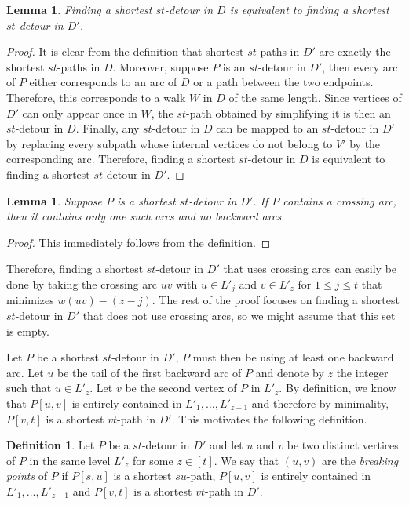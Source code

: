 \documentclass[utf8,11pt]{article}
\theoremstyle{plain}
\newtheorem{lemma}[theorem]{Lemma}
\theoremstyle{definition}
\newtheorem{definition}[theorem]{Definition}
\begin{document}
\begin{lemma}
    Finding a shortest $st$-detour in $D$ is equivalent to finding a shortest $st$-detour in $D'$.
\end{lemma}

\begin{proof}
It is clear from the definition that shortest $st$-paths in $D'$ are exactly the shortest $st$-paths in $D$. Moreover, suppose $P$ is an $st$-detour in $D'$, then every arc of $P$ either corresponds to an arc of $D$ or a path between the two endpoints. Therefore, this corresponds to a walk $W$ in $D$ of the same length. Since vertices of $D'$ can only appear once in $W$, the $st$-path obtained by simplifying it is then an $st$-detour in $D$. Finally, any $st$-detour in $D$ can be mapped to an $st$-detour in $D'$ by replacing every subpath whose internal vertices do not belong to $V'$ by the corresponding arc. Therefore, finding a shortest $st$-detour in $D$ is equivalent to finding a shortest $st$-detour in $D'$. 
\end{proof}


\begin{lemma}
    Suppose $P$ is a shortest $st$-detour in $D'$. If $P$ contains a crossing arc, then it contains only one such arcs and no backward arcs.
\end{lemma}

\begin{proof}
    This immediately follows from the definition.
\end{proof}

Therefore, finding a shortest $st$-detour in $D'$ that uses crossing arcs can easily be done by taking the crossing arc $uv$ with $u \in L'_{j}$ and $v \in L'_{z}$ for $1 \leq j \leq t$ that minimizes $w(uv) - (z-j)$. The rest of the proof focuses on finding a shortest $st$-detour in $D'$ that does not use crossing arcs, so we might assume that this set is empty.

Let $P$ be a shortest $st$-detour in $D'$, $P$ must then be using at least one backward arc. Let $u$ be the tail of the first backward arc of $P$ and denote by $z$ the integer such that $u \in L'_z$. Let $v$ be the second vertex of $P$ in $L'_z$. By definition, we know that $P[u,v]$ is entirely contained in $L'_1, \dots, L'_{z-1}$ and therefore by minimality, $P[v,t]$ is a shortest $vt$-path in $D'$. This motivates the following definition.

\begin{definition}
    Let $P$ be a $st$-detour in $D'$ and let $u$ and $v$ be two distinct vertices of $P$ in the same level $L'_z$ for some $z \in [t]$. We say that $(u,v)$ are the \textit{breaking points} of $P$ if $P[s,u]$ is a shortest $su$-path, $P[u,v]$ is entirely contained in $L'_1, \dots, L'_{z-1}$ and $P[v,t]$ is a shortest $vt$-path in $D'$.
\end{definition}
\end{document}
